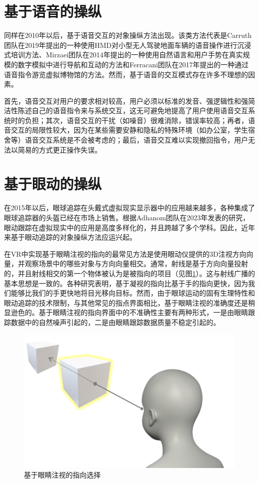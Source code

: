 \section{基于语音的操纵}

同样在2010年以后，基于语音交互的对象操纵方法出现。该类方法代表是Carruth团队在2019年提出的一种使用HMD对小型无人驾驶地面车辆的语音操作进行沉浸式培训方法、Mirzaei团队在2014年提出的一种使用自然语言和用户手势在真实规模的数字模拟中进行导航和互动的方法和Ferracani团队在2017年提出的一种通过语音指令游览虚拟博物馆的方法。然而，基于语音的交互模式存在许多不理想的因素。

首先，语音交互对用户的要求相对较高，用户必须以标准的发音、强逻辑性和强简洁性陈述自己的语音指令来与系统交互，这无可避免地提高了用户使用语音交互系统时的负担；其次，语音交互的干扰（如噪音）很难消除，错误率较高；再者，语音交互的局限性较大，因为在某些需要安静和隐私的特殊环境（如办公室，学生宿舍等）语音交互系统是不会被考虑的；最后，语音交互难以实现撤回指令，用户无法以简易的方式更正操作失误。

\section{基于眼动的操纵}

在2015年以后，眼球追踪在头戴式虚拟现实显示器中的应用越来越多，各种集成了眼球追踪器的头盔已经在市场上销售。根据Adhanom团队在2023年发表的研究，眼动跟踪在虚拟现实中的应用是高度多样化的，并且跨越了多个学科。因此，近年来基于眼动追踪的对象操纵方法应运兴起。

在VR中实现基于眼睛注视的指向的最常见方法是使用眼动仪提供的3D注视方向向量，并观察场景中的哪些对象与方向向量相交。通常，射线是基于方向向量投射的，并且射线相交的第一个物体被认为是被指向的项目（见图\ref{fig-6}）。这与射线广播的基本思想是一致的。各种研究表明，基于凝视的指向比基于手的指向更快，因为我们能够比我们的手更快地将目光移向目标。然而，由于眼球运动的固有生理特性和眼动追踪的技术限制，与其他常见的指点界面相比，基于眼睛注视的准确度还是稍显逊色的。基于眼睛注视的指向界面中的不准确性主要有两种形式，一是由眼睛跟踪数据中的自然噪声引起的，二是由眼睛跟踪数据质量不稳定引起的。

\begin{figure}[b!]
    \centering
    \includegraphics[width=.45\textwidth]{figure/gazing_raycasting.png}
    \caption{基于眼睛注视的指向选择}
    \label{fig-6}
\end{figure}

